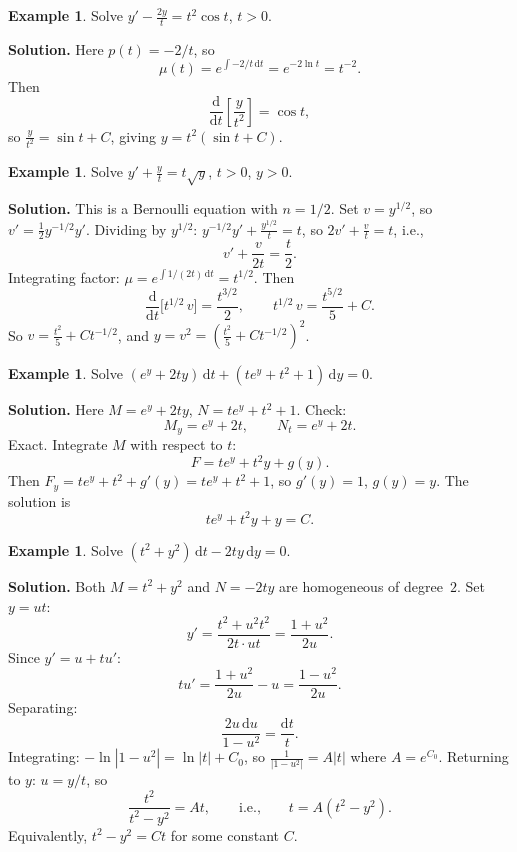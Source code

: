 \documentclass[12pt,a4paper,openany]{book}
\theoremstyle{definition}
\newtheorem{example}[definition]{Example}
\theoremstyle{plain}
\theoremstyle{remark}
\newcommand{\dd}{\mathrm{d}}
\newcommand{\abs}[1]{\left|#1\right|}
\begin{document}
\begin{example}
\label{ex:extra-linear}
Solve $y' - \frac{2y}{t} = t^2\cos t$, $t > 0$.

\textbf{Solution.} Here $p(t) = -2/t$, so
\[
  \mu(t) = e^{\int -2/t\,\dd t} = e^{-2\ln t} = t^{-2}.
\]
Then
\[
  \frac{\dd}{\dd t}\!\left[\frac{y}{t^2}\right] = \cos t,
\]
so $\frac{y}{t^2} = \sin t + C$, giving $y = t^2(\sin t + C)$.
\end{example}

\begin{example}
\label{ex:extra-bernoulli}
Solve $y' + \frac{y}{t} = t\sqrt{y}$, $t > 0$, $y > 0$.

\textbf{Solution.} This is a Bernoulli equation with $n = 1/2$. Set $v = y^{1/2}$, so $v' = \frac{1}{2}y^{-1/2}y'$. Dividing by $y^{1/2}$: $y^{-1/2}y' + \frac{y^{1/2}}{t} = t$, so $2v' + \frac{v}{t} = t$, i.e.,
\[
  v' + \frac{v}{2t} = \frac{t}{2}.
\]
Integrating factor: $\mu = e^{\int 1/(2t)\,\dd t} = t^{1/2}$. Then
\[
  \frac{\dd}{\dd t}\!\bigl[t^{1/2}\,v\bigr] = \frac{t^{3/2}}{2},
  \qquad
  t^{1/2}\,v = \frac{t^{5/2}}{5} + C.
\]
So $v = \frac{t^2}{5} + Ct^{-1/2}$, and $y = v^2 = \left(\frac{t^2}{5} + Ct^{-1/2}\right)^2$.
\end{example}

\begin{example}
\label{ex:extra-exact}
Solve $(e^y + 2ty)\,\dd t + (te^y + t^2 + 1)\,\dd y = 0$.

\textbf{Solution.} Here $M = e^y + 2ty$, $N = te^y + t^2 + 1$. Check:
\[
  M_y = e^y + 2t, \qquad N_t = e^y + 2t.
\]
Exact. Integrate $M$ with respect to $t$:
\[
  F = te^y + t^2 y + g(y).
\]
Then $F_y = te^y + t^2 + g'(y) = te^y + t^2 + 1$, so $g'(y) = 1$, $g(y)=y$. The solution is
\[
  te^y + t^2 y + y = C.
\]
\end{example}

\begin{example}
\label{ex:extra-homogeneous}
Solve $(t^2 + y^2)\,\dd t - 2ty\,\dd y = 0$.

\textbf{Solution.} Both $M = t^2+y^2$ and $N = -2ty$ are homogeneous of degree~$2$. Set $y = ut$:
\[
  y' = \frac{t^2+u^2t^2}{2t\cdot ut} = \frac{1+u^2}{2u}.
\]
Since $y' = u + tu'$:
\[
  tu' = \frac{1+u^2}{2u} - u = \frac{1-u^2}{2u}.
\]
Separating:
\[
  \frac{2u\,\dd u}{1-u^2} = \frac{\dd t}{t}.
\]
Integrating: $-\ln\abs{1-u^2} = \ln\abs{t} + C_0$, so $\frac{1}{\abs{1-u^2}} = A\abs{t}$ where $A = e^{C_0}$. Returning to $y$: $u = y/t$, so
\[
  \frac{t^2}{t^2 - y^2} = At,
  \qquad\text{i.e.,}\qquad
  t = A(t^2 - y^2).
\]
Equivalently, $t^2 - y^2 = Ct$ for some constant $C$.
\end{example}
\end{document}
